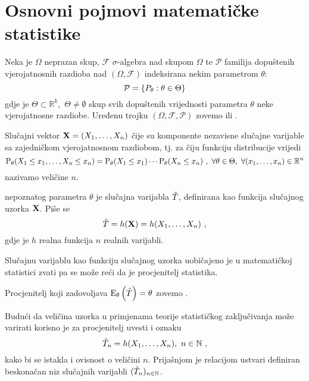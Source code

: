 \section{Osnovni pojmovi matematičke statistike}

Neka je $\Omega$ neprazan skup, $\mathcal{F}$ $\sigma$-algebra
nad skupom $\Omega$ te $\mathcal{P}$ familija dopuštenih
vjerojatnosnih razdioba nad $(\Omega, \mathcal{F})$
indeksirana nekim parametrom $\theta$:
\[
	\mathcal{P} = \left\{ P_{\tv{\theta}} : \tv{\theta} \in \Theta \right\}
\]
gdje je $\Theta \subset \mathbb{R}^k,$ $\Theta \neq \emptyset$
skup svih dopuštenih vrijednosti
parametra $\theta$ neke vjerojatnosne razdiobe.
Uređenu trojku
$(\Omega, \mathcal{F}, \mathcal{P})$
zovemo 
ili
.

\begin{defn}
	Slučajni vektor $\tsvek{X}=(\tsvar{X}_1,\ldots,\tsvar{X}_n)$
	čije su komponente nezavisne
	slučajne varijable sa zajedničkom vjerojatnosnom razdiobom,
	tj. za čiju funkciju distribucije vrijedi
	\[
		\vP_\theta (\tsvar{X}_1 \leq x_1, \ldots, \tsvar{X}_n \leq x_n) =
		\vP_\theta (\tsvar{X}_1 \leq x_1) \cdots \vP_\theta(\tsvar{X}_n \leq x_n) \ ,
		\ \forall \theta \in \Theta , \ \forall (x_1,\ldots,x_n) \in \setR^n
	\]	
	nazivamo 
	veličine $n$.
\end{defn}


\begin{defn}
	nepoznatog parametra $\theta$ je 
	slučajna varijabla $\hat{\tsvar{T}}$, definirana kao 
	funkcija slučajnog uzorka $\tsvek{X}$. Piše se
	\[
		\hat{\tsvar{T}} = h(\tsvek{X}) = h(\tsvar{X}_1,\ldots,\tsvar{X}_n) \ ,
	\]
	gdje je $h$ realna funkcija $n$ realnih varijabli.
\end{defn}

Slučajnu varijablu kao funkciju slučajnog uzorka uobičajeno je
u matematičkoj statistici zvati 
pa se može reći da je procjenitelj statistika.

\begin{defn}
	Procjenitelj koji zadovoljava $\mathrm{E}_{\theta} \left(\hat{\tsvar{T}}\right) = \theta$
	zovemo .
\end{defn}

Budući da veličina uzorka u primjenama teorije statističkog
zaključivanja  može varirati korisno je
za procjenitelj uvesti i oznaku
\[
	\hat{\tsvar{T}}_n = h(\tsvar{X}_{1},\ldots,\tsvar{X}_{n}),\ n \in \mathbb{N} \ ,
\]
kako bi se istakla i ovisnost o veličini $n$.  Prijašnjom je relacijom
ustvari definiran beskonačan niz slučajnih varijabli
$(\hat{\tsvar{T}}_{n})_{n \in \mathbb{N}}$.

